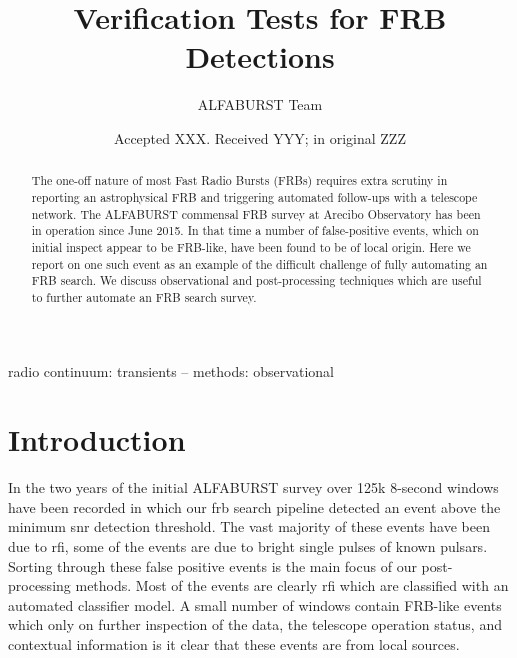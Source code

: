\documentclass[a4paper,fleqn,usenatbib]{mnras}
\title[Verification Tests for FRB Detections]{Verification Tests for FRB
Detections}
\author[ALFABURST Team]{
ALFABURST Team
}
\date{Accepted XXX. Received YYY; in original ZZZ}
\begin{document}
\label{firstpage}
\pagerange{\pageref{firstpage}--\pageref{lastpage}}
\maketitle

\begin{abstract}
The one-off nature of most Fast Radio Bursts (FRBs) requires extra scrutiny in
reporting an astrophysical FRB and triggering automated follow-ups with a
telescope network.  The ALFABURST commensal FRB survey at Arecibo Observatory
has been in operation since June 2015. In that time a number of false-positive
events, which on initial inspect appear to be FRB-like, have been found to be of
local origin. Here we report on one such event as an example of the difficult
challenge of fully automating an FRB search. We discuss observational and
post-processing techniques which are useful to further automate an FRB search
survey.
\end{abstract}

\begin{keywords}
radio continuum: transients -- methods: observational
\end{keywords}


\section{Introduction}
\label{sec:intro}

In the two years of the initial ALFABURST survey\citep{2017ApJS..228...21C} over
125k 8-second windows have been recorded in which our \gls{frb} search pipeline
detected an event above the minimum \gls{snr} detection threshold. The vast
majority of these events have been due to \gls{rfi}, some of the events are due
to bright single pulses of known pulsars. Sorting through these false positive
events is the main focus of our post-processing methods. Most of the events are
clearly \gls{rfi} which are classified with an automated classifier model. A
small number of windows contain FRB-like events which only on further inspection
of the data, the telescope operation status, and contextual information is it
clear that these events are from local sources.
\end{document}
